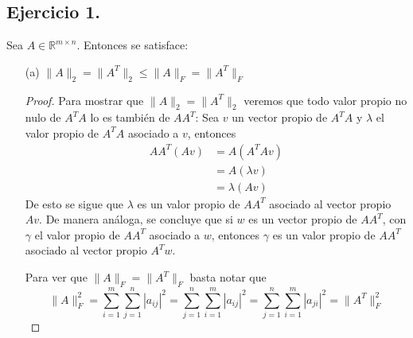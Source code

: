 
\subsection*{Ejercicio 1.}
Sea $A \in \mathbb{R}^{m \times n}$. Entonces se satisface:

\begin{enumerate}
    \item[(a)] $\|A\|_2 = \|A^T\|_2 \leq \|A\|_F = \|A^T\|_F$
    \begin{proof}
    Para mostrar que $\|A\|_2 = \|A^T\|_2$ veremos que todo valor propio no nulo de $A^TA$ lo es también de $AA^T$: Sea $v$ un vector propio de $A^TA$ y $\lambda$ el valor propio de $A^TA$ asociado a $v$, entonces
    \begin{align*}
    AA^T(Av) &= A(A^TAv) \\ 
        & = A(\lambda v) \\ 
        & = \lambda (Av) 
    \end{align*}
    De esto se sigue que $\lambda$ es un valor propio de $AA^T$ asociado al vector propio $Av$. De manera análoga, se concluye que si $w$ es un vector propio de $AA^T$, con $\gamma$ el valor propio de $AA^T$ asociado a $w$, entonces $\gamma$ es un valor propio de $AA^T$ asociado al vector propio $A^Tw$.

    Para ver que $\|A\|_F = \|A^T\|_F$ basta notar que
    \[
    \|A\|_F^2=\sum_{i=1}^{m} \sum_{j=1}^{n} |a_{ij}|^2 = \sum_{j=1}^{n} \sum_{i=1}^m |a_{ij}|^2=\sum_{j=1}^{n} \sum_{i=1}^m |a_{ji}|^2=\|A^T\|_F^2
    \]


\end{proof}
\end{enumerate}
